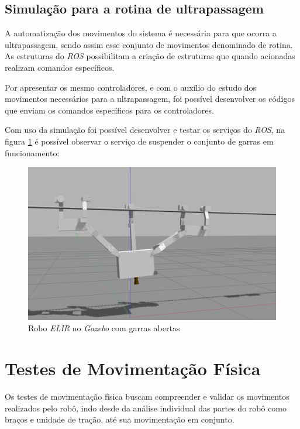 \subsection{Simulação para a rotina de ultrapassagem}\label{sec:simu_ultr}
A automatização dos movimentos do sistema é necessária para que ocorra a ultrapassagem, sendo assim esse conjunto de movimentos denominado de rotina. As estruturas do \textit{ROS} possibilitam a criação de estruturas que quando acionadas realizam comandos específicos.

Por apresentar os mesmo controladores, e com o auxílio do estudo dos movimentos necessários para a ultrapassagem, foi possível desenvolver os códigos que enviam os comandos específicos para os controladores. 

Com uso da simulação foi possível desenvolver e testar os serviços do \textit{ROS}, na figura \ref{fig:simu_garras_abertas} é possível observar o serviço de suspender o conjunto de garras em funcionamento:

\begin{figure}[H]
	\centering
	\includegraphics[scale=0.25]{Figures/servico_simulacao_subirgarra.png}
	\caption{Robo \textit{ELIR} no \textit{Gazebo} com garras abertas}
	\label{fig:simu_garras_abertas}
\end{figure}

\section{Testes de Movimentação Física}\label{sec:test_mov}
Os testes de movimentação física buscam compreender e validar os movimentos realizados pelo robô, indo desde da análise individual das partes do robô como braços e unidade de tração, até sua movimentação em conjunto.

